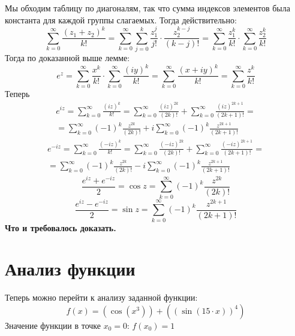 \documentclass[a4paper,12pt]{article} %
\newcommand{\ryad}{\sum\limits^{\infty}_{k = 0}}
\begin{document}
\begin{table}[h!]
\centering
{}
\end{table}
Мы обходим таблицу по диагоналям, так что сумма индексов элементов была константа для каждой группы слагаемых. Тогда действительно:
$$
\ryad \frac{(z_1 + z_2)^k}{k!} = \ryad  \sum\limits_{j = 0}^k \frac{z_1^j}{j!} \cdot \frac{z_2^{k - j}}{(k - j)!} = \ryad \frac{z_1^k}{k!} \cdot \ryad \frac{z_2^k}{k!}
$$
Тогда по доказанной выше лемме:
$$
e^z = \ryad \frac{x^k}{k!} \cdot \ryad \frac{(iy)^k}{k!} = \ryad \frac{(x + iy)^k}{k!} = \ryad \frac{z^k}{k!}
$$
Теперь 
\begin{multline*}
e^{iz} = \ryad \frac{(iz)^k}{k!} = \ryad \frac{(iz)^{2k}}{(2k)!} + \ryad \frac{(iz)^{2k + 1}}{(2k + 1)!} = \\ = \ryad (-1)^k \frac{z^{2k}}{(2k)!} + i \ryad (-1)^k \frac{z^{2k + 1}}{(2k + 1)!}
\end{multline*}
\begin{multline*}
e^{-iz} = \ryad \frac{(-iz)^k}{k!} = \ryad \frac{(-iz)^{2k}}{(2k)!} + \ryad \frac{(-iz)^{2k + 1}}{(2k + 1)!} = \\ = \ryad (-1)^k \frac{z^{2k}}{(2k)!} - i \ryad (-1)^k \frac{z^{2k + 1}}{(2k + 1)!}
\end{multline*}
$$
\frac{e^{iz} + e^{-iz}}{2} = \cos z = \ryad (-1)^k \frac{z^{2k}}{(2k)!}
$$
$$
\frac{e^{iz} - e^{-iz}}{2} = \sin z = \ryad (-1)^k \frac{z^{2k + 1}}{(2k + 1)!}
$$
\textbf{Что и требовалось доказать.}
\newpage 
 \section{Анализ функции} 
Теперь можно перейти к анализу заданной функции: 
\begin{equation}
 f(x) = {(\cos {({x} ^ {{3}})})} + {({(\sin {({{15}} \cdot {x})})} ^ {{4}})}\end{equation}
Значение функции в точке $x_0 = 0$:  $f(x_0) = 1$ \\ 
\end{document}
